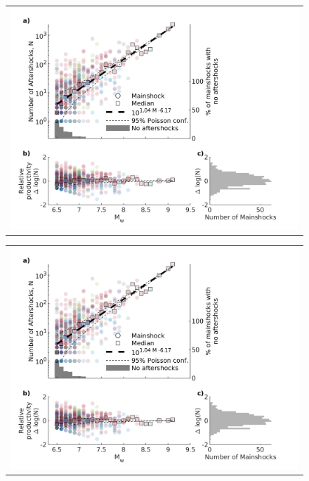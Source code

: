 \documentclass[draft]{agujournal}
\begin{document}
\newpage
\begin{figure}[H]
    \centering
    \begin{tabular}{@{}c@{}}
        \includegraphics{figures/prod_law.png}
    \end{tabular}
    
    \begin{tabular}{@{}c@{}}
        \includegraphics{figures/prod_law_z2008.png}
    \end{tabular}
    

\end{figure}
\end{document}
